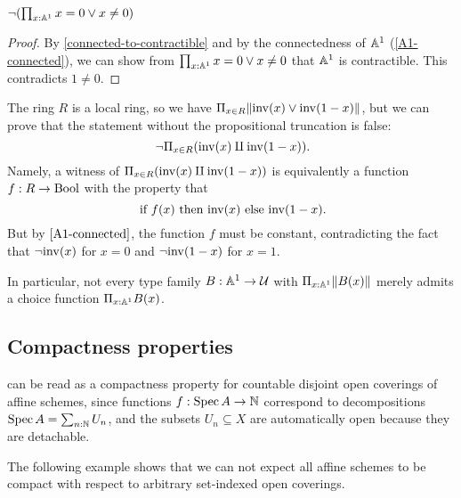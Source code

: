 \begin{corollary}%
  \label{R-not-discrete}
  $\neg(\prod_{x:\mathbb{A}^1}x=0 \vee x\neq 0)$
\end{corollary}

\begin{proof}
  By \cref{connected-to-contractible} and by the connectedness of $\mathbb{A}^1$ (\cref{A1-connected}),
  we can show from $\prod_{x:\mathbb{A}^1}x=0 \vee x\neq 0$ that $\mathbb{A}^1$ is contractible.
  This contradicts $1\neq 0$.
\end{proof}

\begin{example}
  The ring $R$ is a local ring, so we have
  $\Pi_{x \in R} \lVert \mathrm{inv}(x) \lor \mathrm{inv}(1 - x) \rVert$,
  but we can prove that
  the statement without the propositional truncation is false:
  \[ \lnot \Pi_{x \in R} (\inv(x) \amalg \inv(1 - x)) \rlap{.} \]
  Namely,
  a witness of $\Pi_{x \in R} (\mathrm{inv}(x) \amalg \mathrm{inv}(1 - x))$
  is equivalently a function $f : R \to \mathrm{Bool}$
  with the property that
  \[ \text{if $f(x)$ then $\inv(x)$ else $\inv(1 - x)$} \rlap{.} \]
  But by $\cref{A1-connected}$,
  the function $f$ must be constant,
  contradicting the fact that
  $\lnot\mathrm{inv}(x)$ for $x = 0$ and $\lnot\mathrm{inv}(1 - x)$ for $x = 1$.

  In particular,
  not every type family $B : \mathbb{A}^1 \to \mathcal{U}$ with $\Pi_{x : \mathbb{A}^1} \lVert B(x) \rVert$
  merely admits a choice function $\Pi_{x : \mathbb{A}^1} B(x)$.
\end{example}

\subsection{Compactness properties}

 can be read as a compactness property
for countable disjoint open coverings of affine schemes,
since functions $f : \operatorname{Spec} A \to \mathbb{N}$
correspond to decompositions $\operatorname{Spec} A = \sum_{n : \mathbb{N}} U_n$,
and the subsets $U_n \subseteq X$ are automatically open
because they are detachable.

The following example shows that we can not expect all affine schemes
to be compact with respect to arbitrary set-indexed open coverings.

